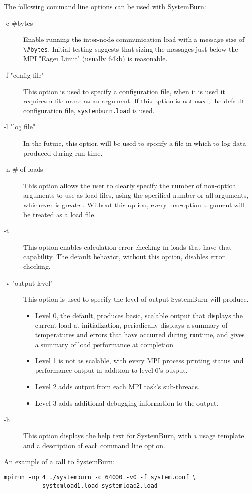 The following command line options can be used with SystemBurn:
\begin{description}
	\item[-c \#bytes] Enable running the inter-node communication load with a message size of \verb!\#bytes!. Initial testing suggests that sizing the messages just below the MPI "Eager Limit" (usually 64kb) is reasonable.
	\item[-f "config file"] This option is used to specify a configuration file, when it is used it requires a file name as an argument. If this option is not used, the default configuration file, \verb!systemburn.load! is used.
	\item[-l "log file"] In the future, this option will be used to specify a file in which to log data produced during run time.
	\item[-n \# of loads] This option allows the user to clearly specify the number of non-option arguments to use as load files, using the specified number or all arguments, whichever is greater. Without this option, every non-option argument will be treated as a load file.
	\item[-t] This option enables calculation error checking in loads that have that capability. The default behavior, without this option, disables error checking.
	\item[-v "output level"] This option is used to specify the level of output SystemBurn will produce.
	\begin{itemize}
		\item Level 0, the default, produces basic, scalable output that displays the current load at initialization, periodically displays a summary of temperatures and errors that have occurred during runtime, and gives a summary of load performance at completion.
		\item Level 1 is not as scalable, with every MPI process printing status and performance output in addition to level 0's output.
		\item Level 2 adds output from each MPI task's sub-threads.
		\item Level 3 adds additional debugging information to the output.
	\end{itemize}
	\item[-h] This option displays the help text for SystemBurn, with a usage template and a description of each command line option.
\end{description}

An example of a call to SystemBurn:

\begin{verbatim}
mpirun -np 4 ./systemburn -c 64000 -v0 -f system.conf \
           systemload1.load systemload2.load
\end{verbatim}
